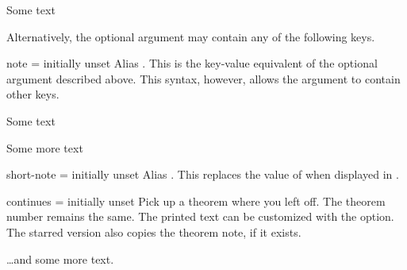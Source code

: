 \documentclass{ltxdoc}
\begin{document}
\begin{keythmscode}[]
\begin{theorem}
Some text
\end{theorem}
\end{keythmscode}

Alternatively, the optional argument may contain any of the following keys.

\begin{docKey}{note}
  {=}
  {initially unset}
Alias . This is the key-value equivalent of the optional argument described above. This syntax, however, allows the argument to contain other keys.

\begin{keythmscode}[]
\begin{theorem}
Some text
\end{theorem}
\begin{theorem}[note=another heading]
Some more text
\end{theorem}
\end{keythmscode}

\end{docKey}

\begin{docKey}{short-note}
  {=}
  {initially unset}
Alias . This replaces the value of  when displayed in .
\end{docKey}


\begin{docKey}{continues}
  {\sarg=}
  {initially unset}
Pick up a theorem where you left off. The theorem number remains the same. The printed text can be customized with the  option. The starred version also copies the theorem note, if it exists.

\begin{keythmscode}[]
\begin{theorem}[continues=foo]
\dots and some more text.
\end{theorem}
\end{keythmscode}

\end{docKey}
\end{document}
